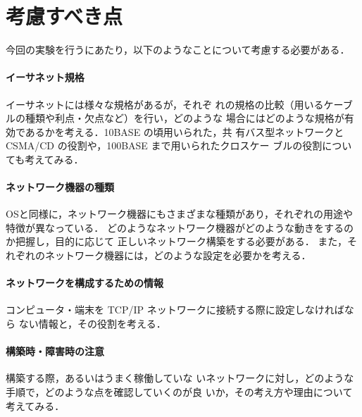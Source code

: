 \section{考慮すべき点}
今回の実験を行うにあたり，以下のようなことについて考慮する必要がある．

\paragraph{イーサネット規格} イーサネットには様々な規格があるが，それぞ
れの規格の比較（用いるケーブルの種類や利点・欠点など）を行い，どのような
場合にはどのような規格が有効であるかを考える．10BASE の頃用いられた，共
有バス型ネットワークとCSMA/CD の役割や，100BASE まで用いられたクロスケー
ブルの役割についても考えてみる．

\paragraph{ネットワーク機器の種類}
OSと同様に，ネットワーク機器にもさまざまな種類があり，それぞれの用途や特徴が異なっている．
どのようなネットワーク機器がどのような動きをするのか把握し，目的に応じて
正しいネットワーク構築をする必要がある．
また，それぞれのネットワーク機器には，どのような設定を必要かを考える．

\paragraph{ネットワークを構成するための情報}
コンピュータ・端末を TCP/IP ネットワークに接続する際に設定しなければなら
ない情報と，その役割を考える．

\paragraph{構築時・障害時の注意} 構築する際，あるいはうまく稼働していな
いネットワークに対し，どのような手順で，どのような点を確認していくのが良
いか，その考え方や理由について考えてみる．

\clearpage

